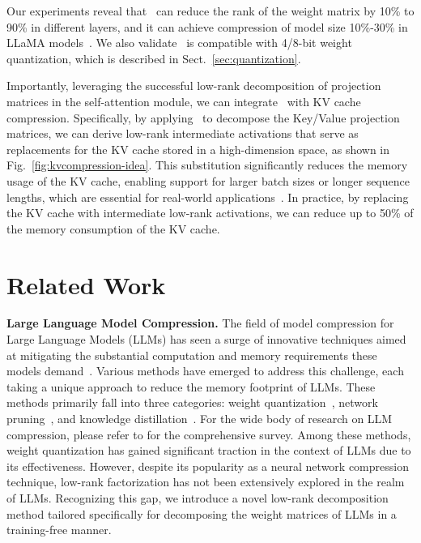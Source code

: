 Our experiments reveal that \asvd~can reduce the rank of the weight matrix by 10\% to 90\% in different layers, and it can achieve compression of model size 10\%-30\% in LLaMA models~\citep{touvron2023llama1,touvron2023llama2}.
We also validate \asvd~is compatible with 4/8-bit weight quantization, which is described in Sect.~\ref{sec:quantization}. 

Importantly, leveraging the successful low-rank decomposition of projection matrices in the self-attention module, we can integrate \asvd~with KV cache compression. 
Specifically, by applying \asvd~to decompose the Key/Value projection matrices, we can derive low-rank intermediate activations that serve as replacements for the KV cache stored in a high-dimension space, as shown in Fig.~\ref{fig:kvcompression-idea}. This substitution significantly reduces the memory usage of the KV cache, enabling support for larger batch sizes or longer sequence lengths, which are essential for real-world applications~\citep{yuan2024llmunveiled}.
In practice, by replacing the KV cache with intermediate low-rank activations, we can reduce up to 50\% of the memory consumption of the KV cache.

\vspace{-0.1in}

\section{Related Work}
\vspace{-0.1in}
\noindent\textbf{Large Language Model Compression.}
The field of model compression for Large Language Models (LLMs) has seen a surge of innovative techniques aimed at mitigating the substantial computation and memory requirements these models demand~\citep{zhu2023survey,yuan2024llmunveiled}. 
Various methods have emerged to address this challenge, each taking a unique approach to reduce the memory footprint of LLMs. These methods primarily fall into three categories: weight quantization~\citep{courbariaux2015binaryconnect,dettmers2022llm}, network pruning~\citep{lecun1989optimal,frantar2023sparsegpt}, and knowledge distillation~\citep{hinton2015distilling,agarwal2023gkd}. 
For the wide body of research on LLM compression, please refer to
\citep{zhu2023survey} for the comprehensive survey. Among these methods, weight quantization has gained significant traction in the context of LLMs due to its effectiveness. However, despite its popularity as a neural network compression technique, low-rank factorization has not been extensively explored in the realm of LLMs. 
Recognizing this gap, we introduce a novel low-rank decomposition method tailored specifically for decomposing the weight matrices of LLMs in a training-free manner.

